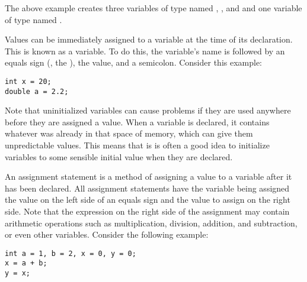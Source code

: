 The above example creates three variables of type  named , , and  and one variable of type  named .  



Values can be immediately assigned to a variable at the time of its declaration.  
This is known as  a variable.  
To do this, the variable's name is followed by an equals sign (\Code{=}, the ), the value, and a semicolon.  Consider this example:

\noindent\begin{minipage}{\linewidth}\begin{lstlisting}
int x = 20;
double a = 2.2;
\end{lstlisting}\end{minipage}
 
Note that uninitialized variables can cause problems if they are used anywhere before they are assigned a value. 
When a variable is declared, it contains whatever was already in that space of memory, which can give them unpredictable values. 
This means that is is often a good idea to initialize variables to some sensible initial value when they are declared.
  

An assignment statement is a method of assigning a value to a variable after it has been declared.
All assignment statements have the variable being assigned the value on the left side of an equals sign and the value to assign on the right side.
Note that the expression on the right side of the assignment may contain arithmetic operations such as multiplication, division, addition, and subtraction, or even other variables.
Consider the following example:

\noindent\begin{minipage}{\linewidth}\begin{lstlisting}
int a = 1, b = 2, x = 0, y = 0;
x = a + b;
y = x;
\end{lstlisting}\end{minipage}




